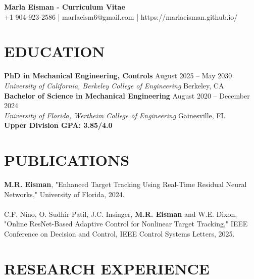 \documentclass[10pt]{article}
\begin{document}
 
\vspace*{-0.5cm} %
 
\begin{center}
    \textbf{\Large Marla Eisman - Curriculum Vitae} \\[0.5em]
    \small +1 904-923-2586 | marlaeism6@gmail.com | https://marlaeisman.github.io/
\end{center}
 
\vspace{1em} %
 
\section*{EDUCATION}

\textbf{PhD in Mechanical Engineering, Controls} \hfill August 2025 -- May 2030 \\
\textit{University of California, Berkeley College of Engineering} \hfill Berkeley, CA \\

\textbf{Bachelor of Science in Mechanical Engineering} \hfill August 2020 -- December 2024 \\
\textit{University of Florida, Wertheim College of Engineering} \hfill Gainesville, FL \\
\textbf{Upper Division GPA: 3.85/4.0}

\section*{PUBLICATIONS}
\textbf{M.R. Eisman}, "Enhanced Target Tracking Using Real-Time Residual Neural Networks," University of Florida, 2024.
\\ \\ 
C.F. Nino, O. Sudhir Patil, J.C. Insinger, \textbf{M.R. Eisman} and W.E. Dixon, "Online ResNet-Based Adaptive Control for Nonlinear Target Tracking," IEEE Conference on Decision and Control, IEEE Control Systems Letters, 2025.
 
\section*{RESEARCH EXPERIENCE}
\end{document}
